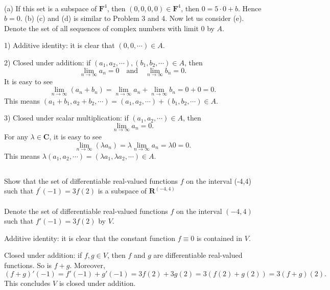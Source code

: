 \documentclass[a4paper]{article}
\begin{document}
\paragraph{}

(a) If this set is a subspace of $\mathbf{F}^4$, then $(0,0,0,0)\in \mathbf{F}^4$, then $0=5\cdot 0+b$.
Hence $b=0$. (b) (c) and (d) is similar to Problem 3 and 4.
Now let us consider (e).
\newline
\newline
Denote the set of all sequences of complex numbers with limit $0$ by $A$.
\newline

1) Additive identity: it is clear that $(0,0,\cdots)\in A$.
\newline

2) Closed under addition: if $(a_1,a_2,\cdots),(b_1,b_2,\cdots)\in A$, then
\[
    \lim_{n\to\infty}a_n=0\quad\text{and}\quad\lim_{n\to\infty}b_n=0.
\]
It is easy to see
\[
    \lim_{n\to\infty}(a_n+b_n)=\lim_{n\to\infty}a_n+\lim_{n\to\infty}b_n=0+0=0.
\]
This means $(a_1+b_1,a_2+b_2,\cdots)=(a_1,a_2,\cdots)+(b_1,b_2,\cdots)\in A$.
\newline

3) Closed under scalar multiplication: if $(a_1,a_2,\cdots)\in A$, then
\[
    \lim_{n\to\infty}a_n=0.
\]
For any $\lambda\in \mathbf{C}$, it is easy to see
\[
    \lim_{n\to\infty}(\lambda a_n)=\lambda\lim_{n\to\infty} a_n=\lambda 0=0.
\]
This means $\lambda(a_1,a_2,\cdots)=(\lambda a_1,\lambda a_2,\cdots)\in A$.

\subsection{}
Show that the set of differentiable real-valued functions $f$ on the interval (-4,4) such that $f^{\prime}(-1)=3 f(2)$ is a subspace of $\mathbf{R}^{(-4,4)}$
\paragraph{}
Denote the set of differentiable real-valued functions $f$ on the interval $(-4,4)$ such that $f'(-1)=3f(2)$ by $V$.

Additive identity: it is clear that the constant function $f\equiv 0$ is contained in $V$.

Closed under addition: if $f,g\in V$, then $f$ and $g$ are differentiable real-valued functions.
So is $f+g$. Moreover,
\[
    (f+g)'(-1)=f'(-1)+g'(-1)=3f(2)+3g(2)=3(f(2)+g(2))=3(f+g)(2).
\]
This concludes $V$ is closed under addition.
\end{document}
